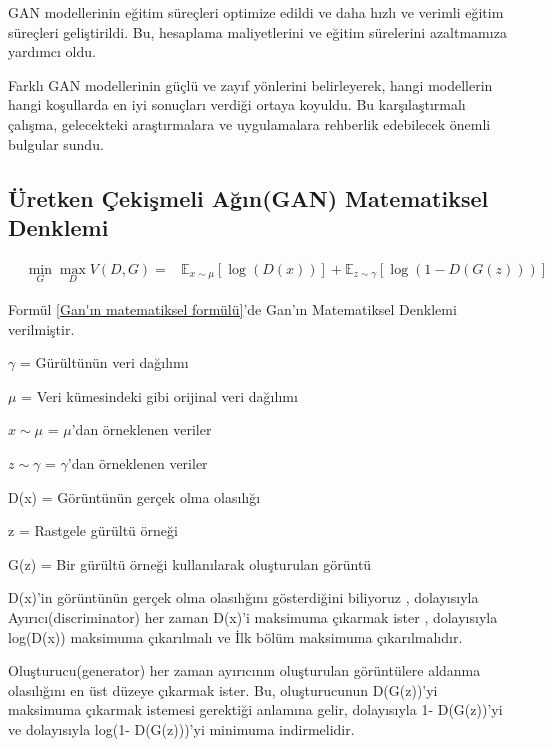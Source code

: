 \documentclass[12pt, a4paper]{article}
\begin{document}
	GAN modellerinin eğitim süreçleri optimize edildi ve daha hızlı ve verimli eğitim süreçleri geliştirildi. Bu, hesaplama maliyetlerini ve eğitim sürelerini azaltmamıza yardımcı oldu.
	
	Farklı GAN modellerinin güçlü ve zayıf yönlerini belirleyerek, hangi modellerin hangi koşullarda en iyi sonuçları verdiği ortaya koyuldu. Bu karşılaştırmalı çalışma, gelecekteki araştırmalara ve uygulamalara rehberlik edebilecek önemli bulgular sundu.
	
	\subsection{Üretken Çekişmeli Ağın(GAN) Matematiksel Denklemi}
	
	\begin{equation}
		\begin{aligned}
			& \min_{G} \max_{D} V(D,G) = 
			& \mathbb{E}_{x\sim\mu}[\log(D(x))] + \mathbb{E}_{z\sim\gamma}[\log(1 - D(G(z)))]
		\end{aligned}
		\label{Gan'ın matematiksel formülü}
	\end{equation}
	
	Formül \eqref{Gan'ın matematiksel formülü}'de Gan'ın Matematiksel Denklemi verilmiştir\cite{yilmaz2023understanding}.
	
	$\gamma$ = Gürültünün veri dağılımı
	
	$\mu$ = Veri kümesindeki gibi orijinal veri dağılımı
	
	${x\sim\mu}$ = $\mu$'dan örneklenen veriler
	
	${z\sim\gamma}$ = $\gamma$'dan örneklenen veriler
	
	D(x) = Görüntünün gerçek olma olasılığı
	
	z = Rastgele gürültü örneği
	
	G(z) = Bir gürültü örneği kullanılarak oluşturulan görüntü
	
	D(x)'in görüntünün gerçek olma olasılığını gösterdiğini biliyoruz , dolayısıyla Ayırıcı(discriminator) her zaman D(x)'i maksimuma çıkarmak ister , dolayısıyla log(D(x)) maksimuma çıkarılmalı ve İlk bölüm maksimuma çıkarılmalıdır.
	
	Oluşturucu(generator) her zaman ayırıcının oluşturulan görüntülere aldanma olasılığını en üst düzeye çıkarmak ister. Bu, oluşturucunun D(G(z))'yi maksimuma çıkarmak istemesi gerektiği anlamına gelir, dolayısıyla 1- D(G(z))'yi ve dolayısıyla log(1- D(G(z)))'yi minimuma indirmelidir\cite{Celebrity-2024-04-16}.
	
\end{document}
